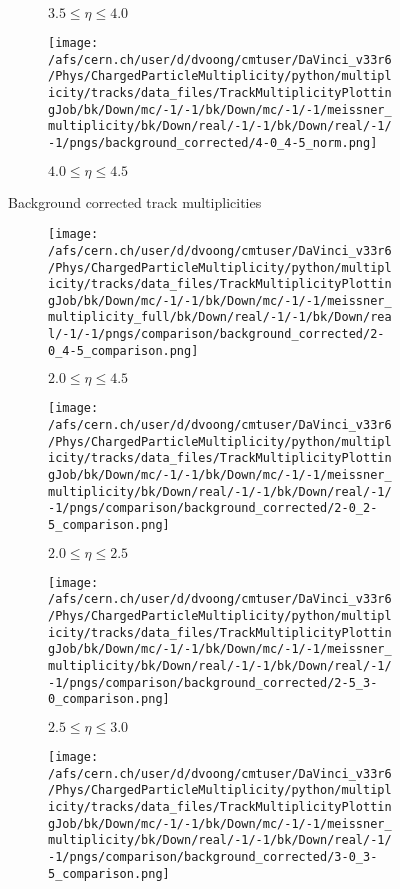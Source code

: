 \begin{figure}[h]
\begin{subfigure}{0.32\textwidth}
		\caption{$3.5 \le \eta \le 4.0$}
	\end{subfigure}
	\begin{subfigure}{0.32\textwidth}
		\texttt{[image: /afs/cern.ch/user/d/dvoong/cmtuser/DaVinci\_v33r6/Phys/ChargedParticleMultiplicity/python/multiplicity/tracks/data\_files/TrackMultiplicityPlottingJob/bk/Down/mc/-1/-1/bk/Down/mc/-1/-1/meissner\_multiplicity/bk/Down/real/-1/-1/bk/Down/real/-1/-1/pngs/background\_corrected/4-0\_4-5\_norm.png]}
		\caption{$4.0 \le \eta \le 4.5$}
	\end{subfigure}
	\caption{Background corrected track multiplicities}
	\label{fig: background corrected track multiplicities}
\end{figure}

\begin{figure}[h]
	\centering
	\begin{subfigure}{0.32\textwidth}
		\texttt{[image: /afs/cern.ch/user/d/dvoong/cmtuser/DaVinci\_v33r6/Phys/ChargedParticleMultiplicity/python/multiplicity/tracks/data\_files/TrackMultiplicityPlottingJob/bk/Down/mc/-1/-1/bk/Down/mc/-1/-1/meissner\_multiplicity\_full/bk/Down/real/-1/-1/bk/Down/real/-1/-1/pngs/comparison/background\_corrected/2-0\_4-5\_comparison.png]}
		\caption{$2.0 \le \eta \le 4.5$}
	\end{subfigure}
	\begin{subfigure}{0.32\textwidth}
		\texttt{[image: /afs/cern.ch/user/d/dvoong/cmtuser/DaVinci\_v33r6/Phys/ChargedParticleMultiplicity/python/multiplicity/tracks/data\_files/TrackMultiplicityPlottingJob/bk/Down/mc/-1/-1/bk/Down/mc/-1/-1/meissner\_multiplicity/bk/Down/real/-1/-1/bk/Down/real/-1/-1/pngs/comparison/background\_corrected/2-0\_2-5\_comparison.png]}
		\caption{$2.0 \le \eta \le 2.5$}
	\end{subfigure}
	\begin{subfigure}{0.32\textwidth}
		\texttt{[image: /afs/cern.ch/user/d/dvoong/cmtuser/DaVinci\_v33r6/Phys/ChargedParticleMultiplicity/python/multiplicity/tracks/data\_files/TrackMultiplicityPlottingJob/bk/Down/mc/-1/-1/bk/Down/mc/-1/-1/meissner\_multiplicity/bk/Down/real/-1/-1/bk/Down/real/-1/-1/pngs/comparison/background\_corrected/2-5\_3-0\_comparison.png]}
		\caption{$2.5 \le \eta \le 3.0$}
	\end{subfigure}
	\begin{subfigure}{0.32\textwidth}
		\texttt{[image: /afs/cern.ch/user/d/dvoong/cmtuser/DaVinci\_v33r6/Phys/ChargedParticleMultiplicity/python/multiplicity/tracks/data\_files/TrackMultiplicityPlottingJob/bk/Down/mc/-1/-1/bk/Down/mc/-1/-1/meissner\_multiplicity/bk/Down/real/-1/-1/bk/Down/real/-1/-1/pngs/comparison/background\_corrected/3-0\_3-5\_comparison.png]}

\end{subfigure}
\end{figure}
